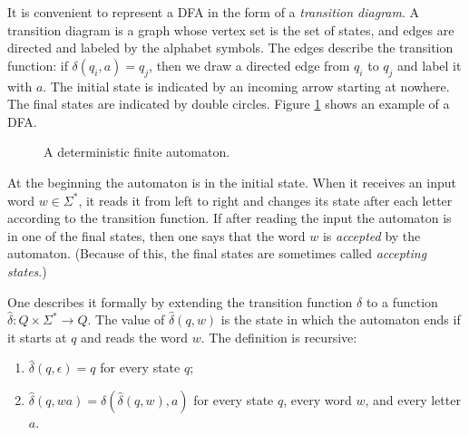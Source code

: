 

\setcounter{section}{1}
\setcounter{subsection}{2}
\setcounter{dfn}{1}


It is convenient to represent a DFA in the form of a \emph{transition diagram}.
A transition diagram is a graph whose vertex set is the set of states, and edges are directed and labeled by the alphabet symbols.
The edges describe the transition function: if $\delta(q_i,a) = q_j$, then we draw a directed edge from $q_i$ to $q_j$ and label it with $a$.
The initial state is indicated by an incoming arrow starting at nowhere.
The final states are indicated by double circles.
Figure \ref{fig:DFAOdd} shows an example of a DFA.

\begin{figure}[htb]
\begin{center}

\caption{A deterministic finite automaton.}
\label{fig:DFAOdd}
\end{center}
\end{figure}

At the beginning the automaton is in the initial state.
When it receives an input word $w \in \Sigma^*$, it reads it from left to right and changes its state after each letter according to the transition function.
If after reading the input the automaton is in one of the final states, then one says that the word $w$ is \emph{accepted} by the automaton.
(Because of this, the final states are sometimes called \emph{accepting states}.)

One describes it formally by extending the transition function $\delta$ to a function $\widehat{\delta} \colon Q \times \Sigma^* \to Q$.
The value of $\widehat{\delta}(q,w)$ is the state in which the automaton ends if it starts at $q$ and reads the word $w$.
The definition is recursive:
\begin{enumerate}
\item
$\widehat{\delta}(q, \epsilon) = q$ for every state $q$;
\item
$\widehat{\delta}(q, wa) = \delta(\widehat{\delta}(q,w), a)$ for every state $q$, every word $w$, and every letter $a$.
\end{enumerate}


